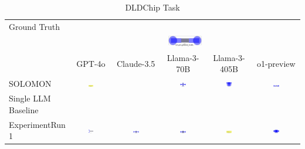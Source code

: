 \begin{table}
  \caption{DLDChip Task}
  \label{table:dldchip}
  \centering
  \begin{tabular}{@{}lccccc@{}}
    \toprule
    Ground Truth \\
    & \multicolumn{5}{c}{\includegraphics[width=0.15\textwidth]{examples_png/DLDChip.png}} \\
    & GPT-4o & Claude-3.5 & Llama-3-70B & Llama-3-405B & o1-preview \\
    \midrule
    SOLOMON & \includegraphics[width=0.15\textwidth]{./pool_all/png/gpt-4o_results/DLDChip.png} &  & \includegraphics[width=0.15\textwidth]{./pool_all/png/claude-3-5-sonnet-20240620_results/DLDChip.png} & \includegraphics[width=0.15\textwidth]{./pool_all/png/watsonx_meta-llama_llama-3-1-70b-instruct_results/DLDChip.png} & \includegraphics[width=0.15\textwidth]{./pool_all/png/watsonx_meta-llama_llama-3-405b-instruct_results/DLDChip.png} \\
    Single LLM Baseline \\
    ExperimentRun 1 & \includegraphics[width=0.15\textwidth]{./run_1/png/gpt-4o_results/DLDChip.png} & \includegraphics[width=0.15\textwidth]{./run_1/png/o1-preview_results/DLDChip.png} & \includegraphics[width=0.15\textwidth]{./run_1/png/claude-3-5-sonnet-20240620_results/DLDChip.png} & \includegraphics[width=0.15\textwidth]{./run_1/png/watsonx_meta-llama_llama-3-1-70b-instruct_results/DLDChip.png} & \includegraphics[width=0.15\textwidth]{./run_1/png/watsonx_meta-llama_llama-3-405b-instruct_results/DLDChip.png} \\

\end{tabular}
\end{table}
